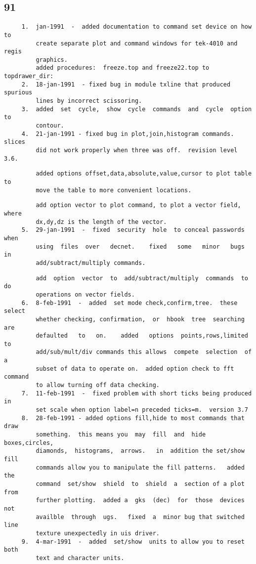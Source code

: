 \subsection{91}
\begin{verbatim}
     1.  jan-1991  -  added documentation to command set device on how to
         create separate plot and command windows for tek-4010 and  regis
         graphics.  
         added procedures:  freeze.top and freeze22.top to topdrawer_dir: 
     2.  18-jan-1991  - fixed bug in module txline that produced spurious
         lines by incorrect scissoring.  
     3.  added  set  cycle,  show  cycle  commands  and  cycle  option to
         contour.  
     4.  21-jan-1991 - fixed bug in plot,join,histogram commands.  slices
         did not work properly when three was off.  revision level 3.6.  
\end{verbatim}

\begin{verbatim}
         added options offset,data,absolute,value,cursor to plot table to
         move the table to more convenient locations.  
\end{verbatim}

\begin{verbatim}
         add option vector to plot command, to plot a vector field, where
         dx,dy,dz is the length of the vector.  
     5.  29-jan-1991  -  fixed  security  hole  to conceal passwords when
         using  files  over   decnet.    fixed   some   minor   bugs   in
         add/subtract/multiply commands.  
\end{verbatim}

\begin{verbatim}
         add  option  vector  to  add/subtract/multiply  commands  to  do
         operations on vector fields.  
     6.  8-feb-1991  -  added  set mode check,confirm,tree.  these select
         whether checking, confirmation,  or  hbook  tree  searching  are
         defaulted   to   on.    added   options  points,rows,limited  to
         add/sub/mult/div commands this allows  compete  selection  of  a
         subset of data to operate on.  added option check to fft command
         to allow turning off data checking.  
     7.  11-feb-1991  -  fixed problem with short ticks being produced in
         set scale when option label=n preceded ticks=m.  version 3.7 
     8.  28-feb-1991 - added options fill,hide to most commands that draw
         something.  this means you  may  fill  and  hide  boxes,circles,
         diamonds,  histograms,  arrows.   in  addition the set/show fill
         commands allow you to manipulate the fill patterns.   added  the
         command  set/show  shield  to  shield  a  section of a plot from
         further plotting.  added a  gks  (dec)  for  those  devices  not
         availble  through  ugs.   fixed  a  minor bug that switched line
         texture unexpectedly in uis driver.  
     9.  4-mar-1991  -  added  set/show  units to allow you to reset both
         text and character units.  
\end{verbatim}

